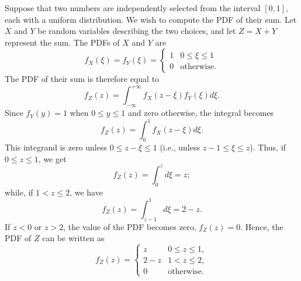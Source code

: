 \begin{example}
Suppose that two numbers are independently selected from the interval $[0,1]$, each with a uniform distribution.
We wish to compute the PDF of their sum.
Let $X$ and $Y$ be random variables describing the two choices, and let $Z = X + Y$ represent the sum.
The PDFs of $X$ and $Y$ are
\begin{equation*}
f_X(\xi) = f_Y(\xi)
= \begin{cases} 1 & 0 \leq \xi \leq 1 \\
0 & \text{otherwise} . \end{cases}
\end{equation*}
The PDF of their sum is therefore equal to
\begin{equation*}
f_Z(z) = \int_{-\infty}^{+\infty} f_X(z - \xi) f_Y(\xi) d\xi .
\end{equation*}
Since $f_Y(y) = 1$ when $0 \leq y \leq 1$ and zero otherwise, the integral becomes
\begin{equation*}
f_Z(z) = \int_0^1 f_X(z - \xi) d\xi .
\end{equation*}
This integrand is zero unless $0 \leq z - \xi \leq 1$ (i.e., unless $z - 1 \leq \xi \leq z$).
Thus, if $0 \leq z \leq 1$, we get
\begin{equation*}
f_Z(z) = \int_0^z d\xi = z ;
\end{equation*}
while, if $1 < z \leq 2$, we have
\begin{equation*}
f_Z(z) = \int_{z - 1}^1 d\xi = 2 - z .
\end{equation*}
If $z < 0$ or $z > 2$, the value of the PDF becomes zero, $f_Z(z) = 0$.
Hence, the PDF of $Z$ can be written as
\begin{equation*}
f_Z(z) = \begin{cases} z & 0 \leq z \leq 1, \\
2-z & 1 < z \leq 2, \\
0 & \text{otherwise} . \end{cases}
\end{equation*}
\end{example}


